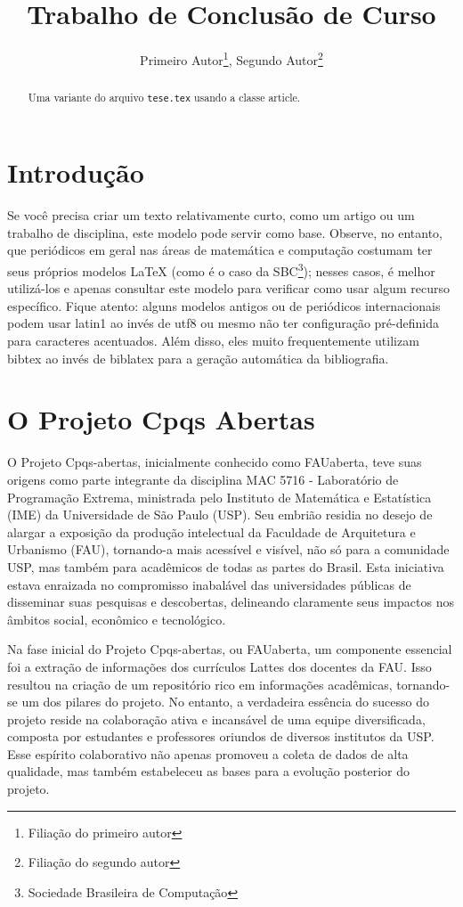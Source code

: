\documentclass[12pt,twoside,english,brazilian]{article}
\title{Trabalho de Conclusão de Curso}
\author{
  Primeiro Autor\thanks{Filiação do primeiro autor},
  Segundo Autor\thanks{Filiação do segundo autor}
}
\date{}
\begin{document}
\maketitle

\begin{abstract}
  Uma variante do arquivo \texttt{tese.tex} usando a classe \textsf{article}.
\end{abstract}

\section{Introdução}

Se você precisa criar um texto relativamente curto, como um artigo ou
um trabalho de disciplina, este modelo pode servir como base. Observe,
no entanto, que periódicos em geral nas áreas de matemática e computação
costumam ter seus próprios modelos \LaTeX{} (como é o caso da
SBC\footnote{Sociedade Brasileira de Computação}\nocite{sbctemplate});
nesses casos, é melhor utilizá-los e apenas consultar este modelo para
verificar como usar algum recurso específico. Fique atento: alguns modelos
antigos ou de periódicos internacionais podem usar \textsf{latin1} ao
invés de \textsf{utf8} ou mesmo não ter configuração pré-definida para
caracteres acentuados. Além disso, eles muito frequentemente utilizam
bibtex ao invés de biblatex para a geração automática da bibliografia.

\section{O Projeto Cpqs Abertas}

O Projeto Cpqs-abertas, inicialmente conhecido como FAUaberta, teve suas origens como parte integrante da disciplina MAC 5716 - Laboratório de Programação Extrema, ministrada pelo Instituto de Matemática e Estatística (IME) da Universidade de São Paulo (USP). Seu embrião residia no desejo de alargar a exposição da produção intelectual da Faculdade de Arquitetura e Urbanismo (FAU), tornando-a mais acessível e visível, não só para a comunidade USP, mas também para acadêmicos de todas as partes do Brasil. Esta iniciativa estava enraizada no compromisso inabalável das universidades públicas de disseminar suas pesquisas e descobertas, delineando claramente seus impactos nos âmbitos social, econômico e tecnológico.

Na fase inicial do Projeto Cpqs-abertas, ou FAUaberta, um componente essencial foi a extração de informações dos currículos Lattes dos docentes da FAU. Isso resultou na criação de um repositório rico em informações acadêmicas, tornando-se um dos pilares do projeto. No entanto, a verdadeira essência do sucesso do projeto reside na colaboração ativa e incansável de uma equipe diversificada, composta por estudantes e professores oriundos de diversos institutos da USP. Esse espírito colaborativo não apenas promoveu a coleta de dados de alta qualidade, mas também estabeleceu as bases para a evolução posterior do projeto.
\end{document}
